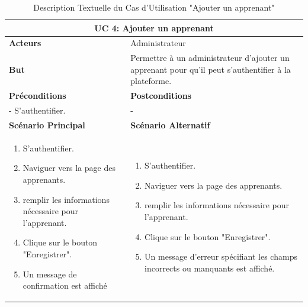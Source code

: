   
    \begin{table}[h!]
        \centering
        \begin{tabular}{| m{7cm} | m{7cm} |}
        \hline
        \multicolumn{2}{|c|}{\textbf{UC 4:} Ajouter un apprenant} \\ \hline
        \textbf{Acteurs} &  Administrateur \\ \hline
        \textbf{But} &   Permettre à un administrateur d'ajouter un apprenant pour qu'il peut s'authentifier à la plateforme. \\ \hline
         \textbf{Préconditions} 
        & 
        \textbf{Postconditions} \\ \hline
        - S'authentifier. & - \\ \hline
        \textbf{Scénario Principal} & \textbf{Scénario Alternatif}
        \\ \hline
        \begin{enumerate}
            \item S'authentifier.
            \item Naviguer vers la page des apprenants.
            \item remplir les informations nécessaire pour l'apprenant.
            \item Clique sur le bouton "Enregistrer".
            \item Un message de confirmation est affiché
        \end{enumerate} & 
        \begin{enumerate}
            \item S'authentifier.
            \item Naviguer vers la page des apprenants.
            \item remplir les informations nécessaire pour l'apprenant.
            \item Clique sur le bouton "Enregistrer".
            \item Un message d'erreur spécifiant les champs incorrects ou manquants est affiché.
        \end{enumerate}
        \\ \hline
        \end{tabular}
        \caption{Description Textuelle du Cas d'Utilisation "Ajouter un apprenant"}
        \label{tab:use_case_description}
        \end{table}
    